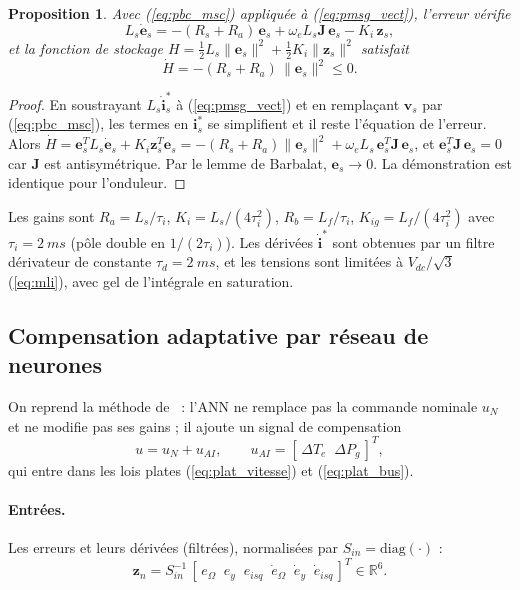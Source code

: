 \documentclass[11pt,a4paper]{article}
\newtheorem{proposition}{Proposition}
\theoremstyle{remark}
\newcommand{\Jm}{\mathbf{J}}            %
\newcommand{\vect}[1]{\bm{#1}}
\begin{document}
\begin{proposition}
Avec (\ref{eq:pbc_msc}) appliquée à (\ref{eq:pmsg_vect}), l'erreur vérifie
\begin{equation}
  L_s\dot{\vect{e}}_s = -(R_s+R_a)\,\vect{e}_s + \omega_e L_s\Jm\,\vect{e}_s - K_i\,\vect{z}_s ,
\end{equation}
et la fonction de stockage $H=\tfrac12 L_s\|\vect{e}_s\|^2 + \tfrac12 K_i\|\vect{z}_s\|^2$ satisfait
\begin{equation}
  \dot H = -(R_s+R_a)\,\|\vect{e}_s\|^2 \le 0 .
\end{equation}
\end{proposition}
\begin{proof}
En soustrayant $L_s\dot{\vect{i}}_s^*$ à (\ref{eq:pmsg_vect}) et en remplaçant $\vect{v}_s$ par
(\ref{eq:pbc_msc}), les termes en $\vect{i}_s^*$ se simplifient et il reste l'équation de l'erreur.
Alors $\dot H = \vect{e}_s^T L_s\dot{\vect{e}}_s + K_i\vect{z}_s^T\vect{e}_s
= -(R_s+R_a)\|\vect{e}_s\|^2 + \omega_e L_s\,\vect{e}_s^T\Jm\,\vect{e}_s$, et
$\vect{e}_s^T\Jm\,\vect{e}_s=0$ car $\Jm$ est antisymétrique. Par le lemme de Barbalat,
$\vect{e}_s\to 0$. La démonstration est identique pour l'onduleur.
\end{proof}

Les gains sont $R_a=L_s/\tau_i$, $K_i=L_s/(4\tau_i^2)$, $R_b=L_f/\tau_i$,
$K_{ig}=L_f/(4\tau_i^2)$ avec $\tau_i=\SI{2}{ms}$ (pôle double en $1/(2\tau_i)$). Les dérivées
$\dot{\vect{i}}^*$ sont obtenues par un filtre dérivateur de constante $\tau_d=\SI{2}{ms}$, et les
tensions sont limitées à $V_{dc}/\sqrt3$ (\ref{eq:mli}), avec gel de l'intégrale en saturation.

\subsection{Compensation adaptative par réseau de neurones}
On reprend la méthode de~\cite{regani} : l'ANN ne remplace pas la commande nominale $u_N$ et ne
modifie pas ses gains ; il ajoute un signal de compensation
\begin{equation}
  u = u_N + u_{AI}, \qquad u_{AI} = [\,\Delta T_e\;\; \Delta P_g\,]^T ,
\end{equation}
qui entre dans les lois plates (\ref{eq:plat_vitesse}) et (\ref{eq:plat_bus}).

\paragraph{Entrées.} Les erreurs et leurs dérivées (filtrées), normalisées par
$S_{in}=\mathrm{diag}(\cdot)$ :
\begin{equation}
  \vect{z}_n = S_{in}^{-1}\,[\,e_\Omega\;\; e_y\;\; e_{isq}\;\; \dot e_\Omega\;\; \dot e_y\;\; \dot e_{isq}\,]^T
  \in\mathbb{R}^6 .
\end{equation}
\end{document}

